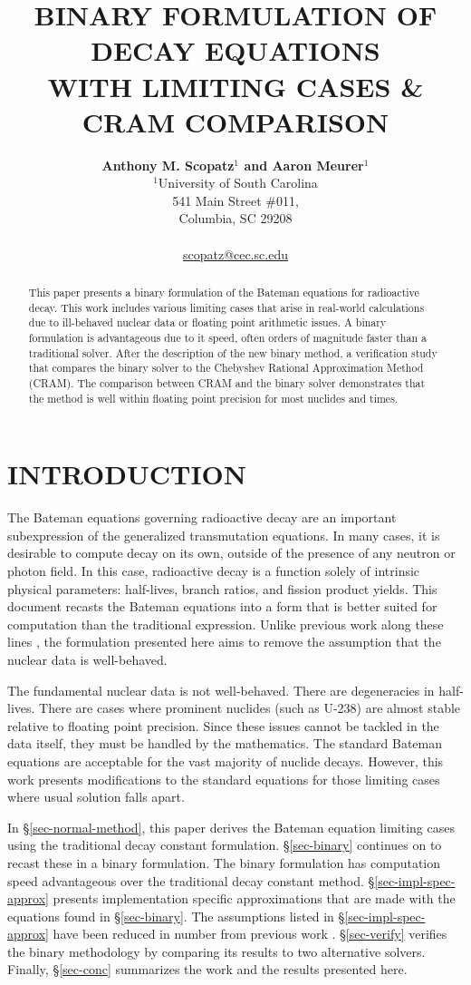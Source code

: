 \documentclass[letterpaper]{physor2018}
\title{BINARY FORMULATION OF DECAY EQUATIONS \\
       WITH LIMITING CASES \& CRAM COMPARISON}
\author{%
  \textbf{Anthony M. Scopatz$^1$ and Aaron Meurer$^1$}\\
  $^1$University of South Carolina \\
  541 Main Street \#011, \\
  Columbia, SC 29208 \\
  \\
  \url{scopatz@cec.sc.edu}
}
\begin{document}
\maketitle
\justify

\begin{abstract}
This paper presents a binary formulation of the Bateman equations
for radioactive decay. This work includes various limiting cases
that arise in real-world calculations due to ill-behaved nuclear data
or floating point arithmetic issues. A binary formulation is advantageous
due to it speed, often orders of magnitude faster than a traditional solver.
After the description of the new binary method,
a verification study that compares the binary solver
to the Chebyshev Rational Approximation Method (CRAM). The comparison
between CRAM and the binary solver demonstrates that the method is
well within floating point precision for most nuclides and times.
\end{abstract}

\section{INTRODUCTION}
\label{sec-intro}
The Bateman equations \cite{bateman1910solution} governing radioactive decay are an
important subexpression
of the generalized transmutation equations. In many cases, it is desirable to compute
decay on its own, outside of the presence of any neutron or photon field. In this
case, radioactive decay is a function solely of intrinsic physical parameters:
half-lives, branch ratios, and fission product yields. This document recasts the
Bateman equations into a form that is better suited for computation than
the traditional expression. Unlike previous work along these lines
\cite{scopatz2015decay}, the formulation presented here aims to remove the
assumption that the nuclear data is well-behaved.

The fundamental nuclear data is not well-behaved. There are degeneracies in
half-lives. There are cases where prominent nuclides (such as U-238) are
almost stable relative to floating point precision. Since these issues
cannot be tackled in the data itself, they must be handled by the
mathematics. The standard Bateman equations are acceptable for the
vast majority of nuclide decays. However, this work presents modifications
to the standard equations for those limiting cases where usual solution
falls apart.

In \S\ref{sec-normal-method}, this paper derives the Bateman equation
limiting cases using the traditional decay constant formulation.
\S\ref{sec-binary} continues on to recast these in a binary formulation.
The binary formulation has computation speed advantageous over the
traditional decay constant method. \S\ref{sec-impl-spec-approx} presents implementation
specific approximations that are made with the equations found in
\S\ref{sec-binary}. The assumptions listed in \S\ref{sec-impl-spec-approx}
have been reduced in number from previous work \cite{scopatz2015decay}.
\S\ref{sec-verify} verifies the binary methodology by comparing its
results to two alternative solvers. Finally, \S\ref{sec-conc} summarizes
the work and the results presented here.
\end{document}
